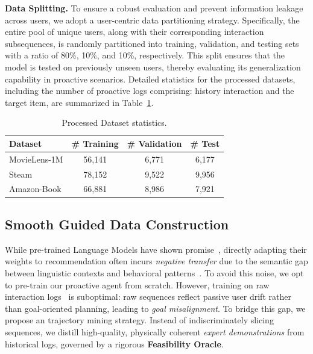 \textbf{Data Splitting.} To ensure a robust evaluation and prevent information leakage across users, we adopt a user-centric data partitioning strategy. Specifically, the entire pool of unique users, along with their corresponding interaction subsequences, is randomly partitioned into training, validation, and testing sets with a ratio of 80\%, 10\%, and 10\%, respectively. This split ensures that the model is tested on previously unseen users, thereby evaluating its generalization capability in proactive scenarios. Detailed statistics for the processed datasets, including the number of proactive logs comprising: history interaction and the target item, are summarized in Table~\ref{tab:processed}.

\begin{table}[t]
\caption{Processed Dataset statistics.}
\label{tab:processed}
 \begin{center}
\begin{tabular}{lccc}
 \toprule[1.5pt]
 \textbf{Dataset} & \textbf{\# Training} & \textbf{\# Validation} & \textbf{\# Test} \\
 \midrule
 MovieLens-1M & 56,141 & 6,771 & 6,177\\
 Steam & 78,152 & 9,522 & 9,956\\
 Amazon-Book & 66,881 & 8,986 & 7,921\\
 \bottomrule[1.5pt]
 \end{tabular}
 \end{center}
 \end{table}

\subsection{Smooth Guided Data Construction}
\label{app:data_process}

While pre-trained Language Models have shown promise~\cite{brown2020language,ouyang2022training}, directly adapting their weights to recommendation often incurs \textit{negative transfer} due to the semantic gap between linguistic contexts and behavioral patterns~\cite{zhang2025collm,bao2023tallrec,wang2025predicting}. To avoid this noise, we opt to pre-train our proactive agent from scratch. However, training on raw interaction logs~\cite{zhu2023influential} is suboptimal: raw sequences reflect passive user drift rather than goal-oriented planning, leading to \textit{goal misalignment}. To bridge this gap, we propose an trajectory mining strategy. Instead of indiscriminately slicing sequences, we distill high-quality, physically coherent \textit{expert demonstrations} from historical logs, governed by a rigorous \textbf{Feasibility Oracle}.

